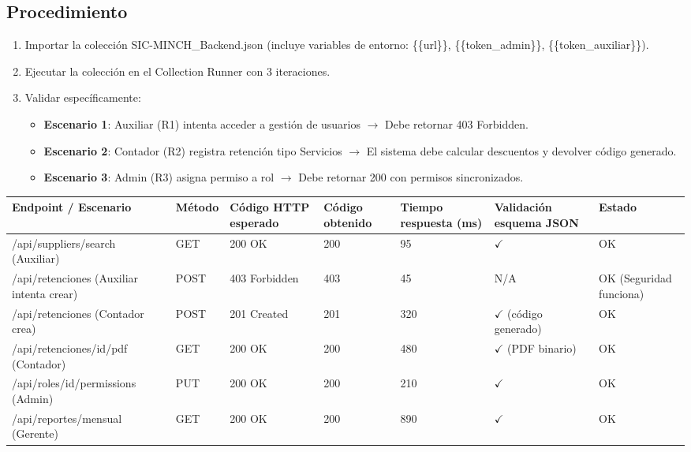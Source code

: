 \documentclass[stu]{apa7}
\begin{document}
\subsection{Procedimiento}

\begin{enumerate}
    \item Importar la colección SIC-MINCH\_Backend.json (incluye variables de entorno: \{\{url\}\}, \{\{token\_admin\}\}, \{\{token\_auxiliar\}\}).
    \item Ejecutar la colección en el Collection Runner con 3 iteraciones.
    \item Validar específicamente:
    \begin{itemize}
        \item \textbf{Escenario 1}: Auxiliar (R1) intenta acceder a gestión de usuarios $\rightarrow$ Debe retornar 403 Forbidden.
        \item \textbf{Escenario 2}: Contador (R2) registra retención tipo Servicios $\rightarrow$ El sistema debe calcular descuentos y devolver código generado.
        \item \textbf{Escenario 3}: Admin (R3) asigna permiso a rol $\rightarrow$ Debe retornar 200 con permisos sincronizados.
    \end{itemize}
\end{enumerate}

\begin{longtable}{|L{5cm}|C{1.5cm}|C{2cm}|C{2cm}|C{2cm}|C{2cm}|C{1.5cm}|}
\hline
{}
\textbf{Endpoint / Escenario} & \textbf{Método} & \textbf{Código HTTP esperado} & \textbf{Código obtenido} & \textbf{Tiempo respuesta (ms)} & \textbf{Validación esquema JSON} & \textbf{Estado} \\
\hline
/api/suppliers/search (Auxiliar) & GET & 200 OK & 200 & 95 & $\checkmark$ & OK \\
\hline
/api/retenciones (Auxiliar intenta crear) & POST & 403 Forbidden & 403 & 45 & N/A & OK (Seguridad funciona) \\
\hline
/api/retenciones (Contador crea) & POST & 201 Created & 201 & 320 & $\checkmark$ (código generado) & OK \\
\hline
/api/retenciones/{id}/pdf (Contador) & GET & 200 OK & 200 & 480 & $\checkmark$ (PDF binario) & OK \\
\hline
/api/roles/{id}/permissions (Admin) & PUT & 200 OK & 200 & 210 & $\checkmark$ & OK \\
\hline
/api/reportes/mensual (Gerente) & GET & 200 OK & 200 & 890 & $\checkmark$ & OK \\
\hline
\end{longtable}
\end{document}
